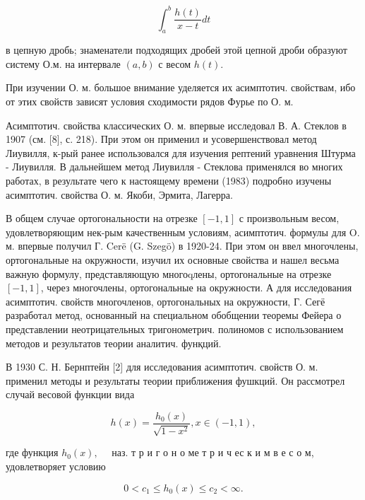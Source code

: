 \documentclass[10pt]{article}
\begin{document}
\[

\int_{a}^{b} \frac{h(t)}{x-t} d t

\]



в цепную дробь; знаменатели подходящих дробей этой цепной дроби образуют систему О.м. на интервале $(a, b)$ с весом $h(t)$.



При изучении О. м. большое внимание уделяется их асимптотич. свойствам, ибо от этих свойств зависят условия сходимости рядов Фурье по О. м.



Асимптотич. свойства классических О. м. впервые исследовал В. А. Стеклов в 1907 (см. [8], с. 218). При этом он применил и усовершенствовал метод Лиувилля, к-рый ранее использовался для изучения рептений уравнения Штурма - Лиувилля. В дальнейшем метод Лиувилля - Стеклова применялся во многих работах, в результате чего к настоящему времени (1983) подробно изучены асимптотич. свойства О. м. Якоби, Эрмита, Лагерра.



В общем случае ортогональности на отрезке $[-1,1]$ с произвольным весом, удовлетворяющим нек-рым качественным условиям, асимптотич. формулы для O. м. впервые получил Г. Cerë (G. Szegö) в 1920-24. При этом он ввел многочлены, ортогональные на окружности, изучил их основные свойства и нашел весьма важную формулу, представляющую многоqлены, ортогональные на отрезке $[-1,1]$, через многочлены, ортогональные на окружности. А для исследования асимптотич. свойств многочленов, ортогональных на окружности, Г. Сегё разработал метод, основанный на специальном обобщении теоремы Фейера о представлении неотрицательных тригонометрич. полиномов с использованием методов и результатов теории аналитич. фунқций.



В 1930 С. Н. Бернптейн [2] для исследования асимптотич. свойств О. м. применил методы и результаты теории приближения фушкций. Он рассмотрел случай весовой функции вида



\[

h(x)=\frac{h_{0}(x)}{\sqrt{1-x^{2}}}, x \in(-1,1),

\]



где функция $h_{0}(x), \quad$ наз. т р и г о н о ме т р и ч ес к и м в е с о м, удовлетворяет условию



\[

0<c_{1} \leqslant h_{0}(x) \leqslant c_{2}<\infty .

\]
\end{document}
